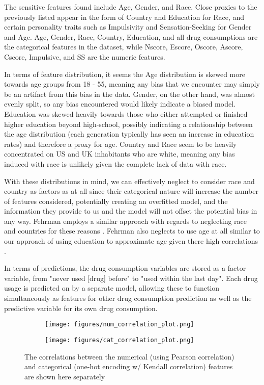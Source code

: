 \documentclass{article}
\begin{document}
The sensitive features found include Age, Gender, and Race. Close proxies to the previously listed appear in the form of Country and Education for Race, and certain personality traits such as Impulsivity and Sensation-Seeking for Gender and Age. Age, Gender, Race, Country, Education, and all drug consumptions are the categorical features in the dataset, while Nscore, Escore, Oscore, Ascore, Cscore, Impulsive, and SS are the numeric features.

In terms of feature distribution, it seems the Age distribution is skewed more towards age groups from 18 - 55, meaning any bias that we encounter may simply be an artifact from this bias in the data. Gender, on the other hand, was almost evenly split, so any bias encountered would likely indicate a biased model. Education was skewed heavily towards those who either attempted or finished higher education beyond high-school, possibly indicating a relationship between the age distribution (each generation typically has seen an increase in education rates) and therefore a proxy for age. Country and Race seem to be heavily concentrated on US and UK inhabitants who are white, meaning any bias induced with race is unlikely given the complete lack of data with race.

With these distributions in mind, we can effectively neglect to consider race and country as factors as at all since their categorical nature will increase the number of features considered, potentially creating an overfitted model, and the information they provide to us and the model will not offset the potential bias in any way. Fehrman employs a similar approach with regards to neglecting race and countries for these reasons \cite{Fehrman}. Fehrman also neglects to use age at all similar to our approach of using education to approximate age given there high correlations \cite{Fehrman}.    

In terms of predictions, the drug consumption variables are stored as a factor variable, from "never used [drug] before" to "used within the last day". Each drug usage is predicted on by a separate model, allowing these to function simultaneously as features for other drug consumption prediction as well as the predictive variable for its own drug consumption.

\begin{figure}[ht]
    \centering
    \begin{subfigure}{0.4\textwidth}
        \texttt{[image: figures/num\_correlation\_plot.png]}
        \caption{\label{fig:num_corr}}
    \end{subfigure}
    \begin{subfigure}{0.4\textwidth}
        \texttt{[image: figures/cat\_correlation\_plot.png]}
        \caption{\label{fig:cat_corr}}
    \end{subfigure}
    \caption{The correlations between the numerical (using Pearson correlation) and categorical (one-hot encoding w/ Kendall correlation) features are shown here separately}
    \label{fig:1}
\end{figure}
\end{document}
